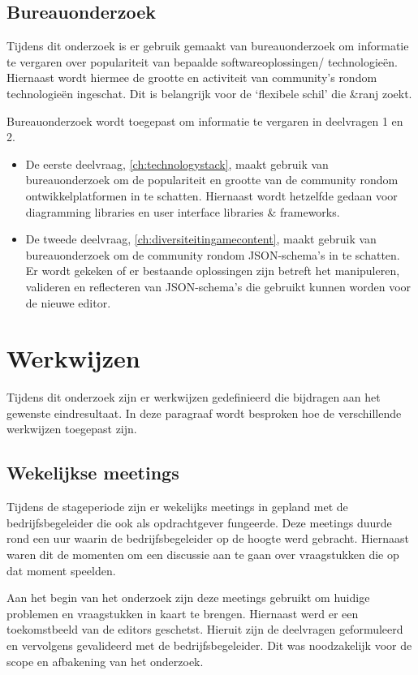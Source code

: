 \subsection{Bureauonderzoek}
Tijdens dit onderzoek is er gebruik gemaakt van bureauonderzoek om informatie te vergaren over populariteit van bepaalde softwareoplossingen/ technologieën. Hiernaast wordt hiermee de grootte en activiteit van community’s rondom technologieën ingeschat. Dit is belangrijk voor de ‘flexibele schil’ die \&ranj zoekt.

Bureauonderzoek wordt toegepast om informatie te vergaren in deelvragen 1 en 2.
\begin{itemize}
    \item De eerste deelvraag, \autoref{ch:technologystack}, maakt gebruik van bureauonderzoek om de populariteit en grootte van de community rondom ontwikkelplatformen in te schatten. Hiernaast wordt hetzelfde gedaan voor diagramming libraries en user interface libraries \& frameworks. 
    \item De tweede deelvraag, \autoref{ch:diversiteitingamecontent}, maakt gebruik van bureauonderzoek om de community rondom JSON-schema’s in te schatten. Er wordt gekeken of er bestaande oplossingen zijn betreft het manipuleren, valideren en reflecteren van JSON-schema’s die gebruikt kunnen worden voor de nieuwe editor.
\end{itemize}

\section{Werkwijzen}
Tijdens dit onderzoek zijn er werkwijzen gedefinieerd die bijdragen aan het gewenste eindresultaat. In deze paragraaf wordt besproken hoe de verschillende werkwijzen toegepast zijn.

\subsection{Wekelijkse meetings}
Tijdens de stageperiode zijn er wekelijks meetings in gepland met de bedrijfsbegeleider die ook als opdrachtgever fungeerde. Deze meetings duurde rond een uur waarin de bedrijfsbegeleider op de hoogte werd gebracht. Hiernaast waren dit de momenten om een discussie aan te gaan over vraagstukken die op dat moment speelden.

Aan het begin van het onderzoek zijn deze meetings gebruikt om huidige problemen en vraagstukken in kaart te brengen. Hiernaast werd er een toekomstbeeld van de editors geschetst. Hieruit zijn de deelvragen geformuleerd en vervolgens gevalideerd met de bedrijfsbegeleider. Dit was noodzakelijk voor de scope en afbakening van het onderzoek.

